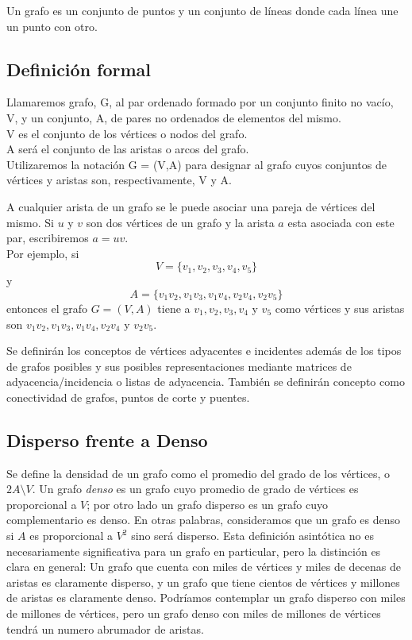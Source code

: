 \documentclass[a4paper,12pt]{article}
\begin{document}
Un grafo es un conjunto de puntos y un conjunto de líneas donde cada línea une un punto con otro. 

\subsection{Definición formal}

\begin{fondo}
Llamaremos grafo, G, al par ordenado formado por un conjunto finito no vacío, V, y un conjunto, A, de pares no ordenados de elementos del mismo.\\
\smallskip
\quad V es el conjunto de los vértices o nodos del grafo.\\
\smallskip
\quad A será el conjunto de las aristas o arcos del grafo.\\
\smallskip
Utilizaremos la notación G = (V,A) para designar al grafo cuyos conjuntos de vértices y aristas son, respectivamente, V y A.
\end{fondo}

A cualquier arista de un grafo se le puede asociar una pareja de vértices del mismo. Si $u$ y $v$ son dos vértices de un grafo y la arista $a$ esta asociada con este par, escribiremos $a = uv$.\\

Por ejemplo, si\\
\[ V = \{v_1, v_2, v_3, v_4, v_5\} \]
y\\
\[ A = \{v_1v_2, v_1v_3, v_1v_4, v_2v_4, v_2v_5\} \]
entonces el grafo $G = (V,A)$ tiene a $v_1, v_2, v_3, v_4$ y $v_5$ como vértices y sus aristas son $v_1v_2, v_1v_3, v_1v_4, v_2v_4$ y $v_2v_5$.

Se definirán los conceptos de vértices adyacentes e incidentes además de los tipos de grafos posibles y sus posibles representaciones mediante matrices de adyacencia/incidencia o listas de adyacencia. También se definirán concepto como conectividad de grafos, puntos de corte y puentes.

\subsection{Disperso frente a Denso}

Se define la densidad de un grafo como el promedio del grado de los vértices, o $2 A \setminus V$. Un grafo \emph{denso} es un grafo cuyo promedio de grado de vértices es proporcional a $V$; por otro lado un grafo disperso es un grafo cuyo complementario es denso. En otras palabras, consideramos que un grafo es denso si $A$ es proporcional a $V^2$ sino será disperso. Esta definición asintótica no es necesariamente significativa para un grafo en particular, pero la distinción es clara en general: Un grafo que cuenta con miles de vértices y miles de decenas de aristas es claramente disperso, y un grafo que tiene cientos de vértices y millones de aristas es claramente denso. Podríamos contemplar un grafo disperso con miles de millones de vértices, pero un grafo denso con miles de millones de vértices tendrá un numero abrumador de aristas. \\
\end{document}

